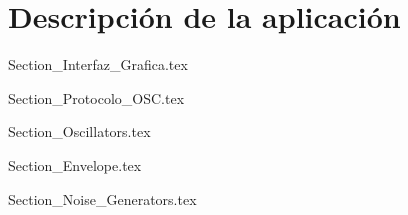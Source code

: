 \chapter{Descripción de la aplicación}

	{Section_Interfaz_Grafica.tex}
	
	{Section_Protocolo_OSC.tex}
	
	{Section_Oscillators.tex}
	
	{Section_Envelope.tex}	
	
	{Section_Noise_Generators.tex}
